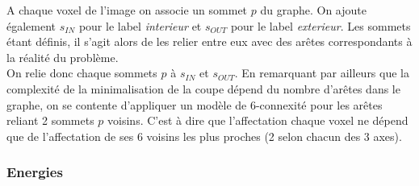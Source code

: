 \documentclass{article}
\begin{document}
A chaque voxel de l'image on associe un sommet $p$ du graphe. On ajoute également $s_{IN}$ pour le label \textit{interieur} et $s_{OUT}$ pour le label \textit{exterieur}. Les sommets étant définis, il s'agit alors de les relier entre eux avec des arêtes correspondants à la réalité du problème.\\
On relie donc chaque sommets $p$ à $s_{IN}$ et $s_{OUT}$. En remarquant par ailleurs que la complexité de la minimalisation de la coupe dépend du nombre d'arêtes dans le graphe, on se contente d'appliquer un modèle de 6-connexité pour les arêtes reliant 2 sommets $p$ voisins. C'est à dire que l'affectation chaque voxel ne dépend que de l'affectation de ses 6 voisins les plus proches (2 selon chacun des 3 axes).

\subsubsection{Energies}
\end{document}
